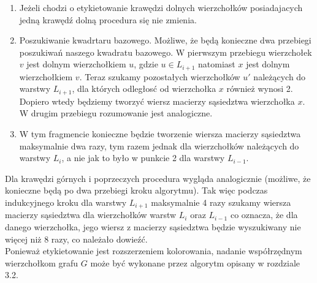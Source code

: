 \documentclass[12pt,a4paper,titlepage]{article}
\begin{document}
\begin{enumerate}
\item 
Jeżeli chodzi o etykietowanie krawędzi dolnych wierzchołków posiadajacych jedną krawędź dolną procedura się nie zmienia.
\item
Poszukiwanie kwadrtaru bazowego. Możliwe, że będą konieczne dwa przebiegi poszukiwań naszego kwadratu bazowego. W pierwszym przebiegu wierzchołek $v$ jest dolnym wierzchołkiem $u$, gdzie $u \in L_{i+1}$ natomiast $x$ jest dolnym wierzchołkiem $v$. Teraz szukamy pozostałych wierzchołków $u'$ należących do warstwy $L_{i+1}$, dla których odległosć od wierzchołka $x$ również wynosi 2. Dopiero wtedy będziemy tworzyć wiersz macierzy sąsiedztwa wierzchołka $x$. W drugim przebiegu rozumowanie jest analogiczne. \\
\item
W tym fragmencie konieczne będzie tworzenie wiersza macierzy sąsiedztwa maksymalnie dwa razy, tym razem jednak dla wierzchołków należących do warstwy $L_i$, a nie jak to było w punkcie 2 dla warstwy $L_{i-1}$.
\end{enumerate}
Dla krawędzi górnych i poprzeczych procedura wygląda analogicznie (możliwe, że konieczne będą po dwa przebiegi kroku algorytmu). Tak więc podczas indukcyjnego kroku dla warstwy $L_{i+1}$ maksymalnie 4 razy szukamy wiersza macierzy sąsiedztwa dla wierzchołków warstw $L_{i} $ oraz $L_{i-1}$ co oznacza, że dla danego wierzchołka, jego wiersz z macierzy sąsiedztwa będzie wyszukiwany nie więcej niż 8 razy, co należało dowieźć. \\

Ponieważ etykietowanie jest rozszerzeniem kolorowania, nadanie współrzędnym wierzchołkom grafu $G$ może być wykonane przez algorytm opisany w rozdziale 3.2.\\
\newpage
\end{document}
